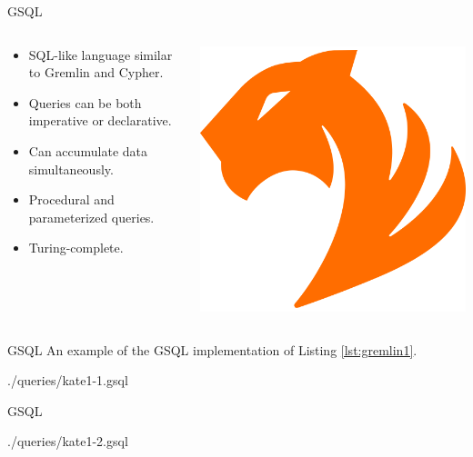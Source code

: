 \begin{frame}{GSQL}
    \begin{columns}
        \begin{column}{.6\textwidth}
            \begin{itemize}
                \item SQL-like language similar to Gremlin and Cypher.
                \item Queries can be both imperative or declarative.
                \item Can accumulate data simultaneously.
                \item Procedural and parameterized queries.
                \item Turing-complete.
            \end{itemize}
            \end{column}%
            \hfill%
            \begin{column}{.39\textwidth}
            \centering
            \includegraphics[width=0.7\columnwidth]{img/database-logos/tigergraph.png}
        \end{column}%
    \end{columns}
\end{frame}

\begin{frame}{GSQL}
    An example of the GSQL implementation of Listing \ref{lst:gremlin1}.

    {./queries/kate1-1.gsql}
\end{frame}

\begin{frame}{GSQL}

    {./queries/kate1-2.gsql}
\end{frame}


